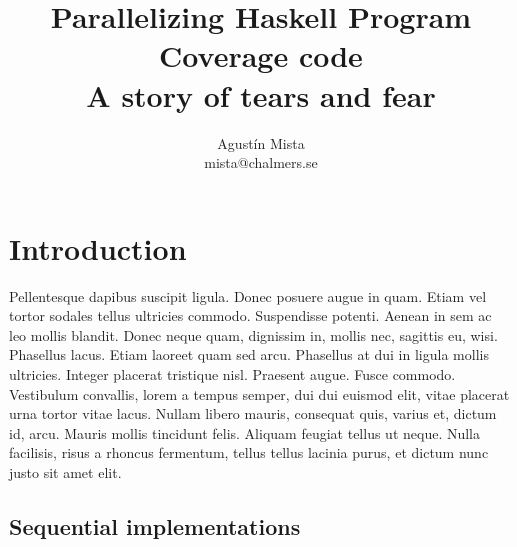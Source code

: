 \documentclass[a4paper,10pt]{article}
\begin{document}

\title{Parallelizing Haskell Program Coverage code\\
  \Large{A story of tears and fear}
}
\author{Agust\'in Mista\\ mista@chalmers.se}
\date{}
\maketitle


\section*{Introduction}

Pellentesque dapibus suscipit ligula. Donec posuere augue in quam. Etiam vel
tortor sodales tellus ultricies commodo. Suspendisse potenti. Aenean in sem ac
leo mollis blandit. Donec neque quam, dignissim in, mollis nec, sagittis eu,
wisi. Phasellus lacus. Etiam laoreet quam sed arcu. Phasellus at dui in ligula
mollis ultricies. Integer placerat tristique nisl. Praesent augue. Fusce
commodo. Vestibulum convallis, lorem a tempus semper, dui dui euismod elit,
vitae placerat urna tortor vitae lacus. Nullam libero mauris, consequat quis,
varius et, dictum id, arcu. Mauris mollis tincidunt felis. Aliquam feugiat
tellus ut neque. Nulla facilisis, risus a rhoncus fermentum, tellus tellus
lacinia purus, et dictum nunc justo sit amet elit.

\subsection*{Sequential implementations}
\end{document}
